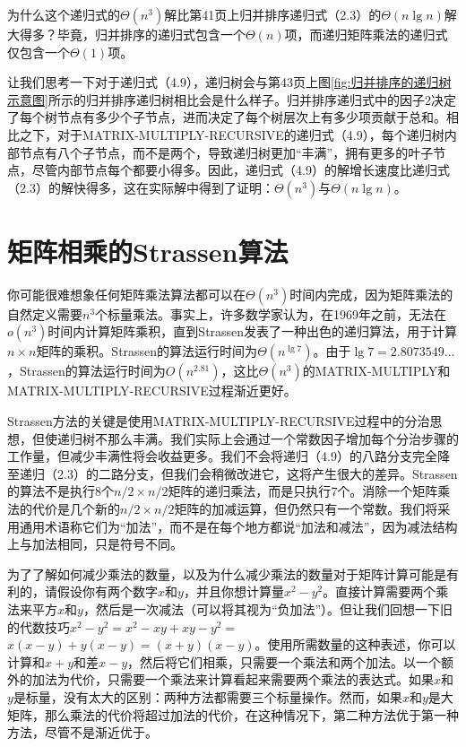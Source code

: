 \documentclass[lang=cn,newtx,10pt,scheme=chinese]{elegantbook}
\begin{document}
为什么这个递归式的$\Theta\left(n^3\right)$解比第41页上归并排序递归式（2.3）的$\Theta(n \lg n)$解大得多？毕竟，归并排序的递归式包含一个$\Theta(n)$项，而递归矩阵乘法的递归式仅包含一个$\Theta(1)$项。

让我们思考一下对于递归式（4.9），递归树会与第43页上图\ref{fig:归并排序的递归树示意图}所示的归并排序递归树相比会是什么样子。归并排序递归式中的因子2决定了每个树节点有多少个子节点，进而决定了每个树层次上有多少项贡献于总和。相比之下，对于MATRIX-MULTIPLY-RECURSIVE的递归式（4.9），每个递归树内部节点有八个子节点，而不是两个，导致递归树更加``丰满''，拥有更多的叶子节点，尽管内部节点每个都要小得多。因此，递归式（4.9）的解增长速度比递归式（2.3）的解快得多，这在实际解中得到了证明：$\Theta\left(n^3\right)$与$\Theta(n \lg n)$。

\section{矩阵相乘的Strassen算法}\label{section-4.2}

你可能很难想象任何矩阵乘法算法都可以在$\Theta\left(n^3\right)$时间内完成，因为矩阵乘法的自然定义需要$n^3$个标量乘法。事实上，许多数学家认为，在1969年之前，无法在$o\left(n^3\right)$时间内计算矩阵乘积，直到Strassen发表了一种出色的递归算法，用于计算$n \times n$矩阵的乘积。Strassen的算法运行时间为$\Theta\left(n^{\lg 7}\right)$。由于$\lg 7=2.8073549 \ldots$，Strassen的算法运行时间为$O\left(n^{2.81}\right)$，这比$\Theta\left(n^3\right)$的MATRIX-MULTIPLY和MATRIX-MULTIPLY-RECURSIVE过程渐近更好。

Strassen方法的关键是使用MATRIX-MULTIPLY-RECURSIVE过程中的分治思想，但使递归树不那么丰满。我们实际上会通过一个常数因子增加每个分治步骤的工作量，但减少丰满性将会收益更多。我们不会将递归（4.9）的八路分支完全降至递归（2.3）的二路分支，但我们会稍微改进它，这将产生很大的差异。Strassen的算法不是执行$8$个$n / 2 \times n / 2$矩阵的递归乘法，而是只执行$7$个。消除一个矩阵乘法的代价是几个新的$n / 2 \times n / 2$矩阵的加减运算，但仍然只有一个常数。我们将采用通用术语称它们为``加法''，而不是在每个地方都说``加法和减法''，因为减法结构上与加法相同，只是符号不同。

为了了解如何减少乘法的数量，以及为什么减少乘法的数量对于矩阵计算可能是有利的，请假设你有两个数字$x$和$y$，并且你想计算量$x^2-y^2$。直接计算需要两个乘法来平方$x$和$y$，然后是一次减法（可以将其视为“负加法”）。但让我们回想一下旧的代数技巧$x^2-y^2=x^2-x y+x y-y^2=$ $x(x-y)+y(x-y)=(x+y)(x-y)$。使用所需数量的这种表述，你可以计算和$x+y$和差$x-y$，然后将它们相乘，只需要一个乘法和两个加法。以一个额外的加法为代价，只需要一个乘法来计算看起来需要两个乘法的表达式。如果$x$和$y$是标量，没有太大的区别：两种方法都需要三个标量操作。然而，如果$x$和$y$是大矩阵，那么乘法的代价将超过加法的代价，在这种情况下，第二种方法优于第一种方法，尽管不是渐近优于。
\end{document}
